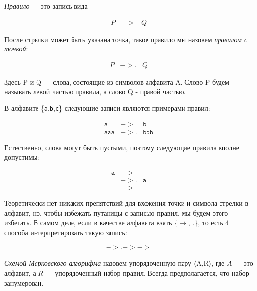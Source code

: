 \documentclass[12pt,a4paper,oneside]{article}
\newcommand{\s}[1]{\texttt{#1}}
\begin{document}
\begin{definition}\emph{Правило} --- это запись вида 
\begin{bnf}\begin{eqnarray*}P &->& Q \end{eqnarray*}\end{bnf}После
стрелки может быть указана точка, такое правило мы назовем 
\emph{правилом с точкой}:
\begin{bnf}\begin{eqnarray*}P &->.& Q \end{eqnarray*}\end{bnf}Здесь 
P и Q --- слова, состоящие из символов алфавита A. 
Слово P будем называть левой частью правила, а слово Q - правой частью.
\end{definition}

\begin{example}В алфавите \{\s{a},\s{b},\s{c}\} следующие записи являются примерами правил: 
\begin{bnf}\begin{eqnarray*}
  \s{a} &->& \s{b}\\
  \s{aaa} &->.& \s{bbb}
\end{eqnarray*}
\end{bnf}Естественно, слова могут быть пустыми, поэтому следующие правила вполне допустимы:
\begin{bnf}\begin{eqnarray*}
 \s{a} &->&\\
 &->.& \s{a}\\
 &->&
\end{eqnarray*}\end{bnf}  
\end{example}

Теоретически нет никаких препятствий для вхожения точки и символа стрелки
в алфавит, но, чтобы избежать путаницы с записью правил, мы будем этого
избегать. В самом деле, если в качестве алфавита взять \{$\longrightarrow$, .\}, 
то есть 4 способа интерпретировать такую запись:
\begin{bnf}\begin{eqnarray*}
->.->->
\end{eqnarray*}\end{bnf}

\begin{definition} \emph{Схемой Марковского алгорифма}
назовем упорядоченную пару $\langle$A,R$\rangle$, где $A$ --- это алфавит, 
а $R$ --- упорядоченный набор правил. Всегда предполагается, что набор 
занумерован.
\end{definition}
\end{document}
